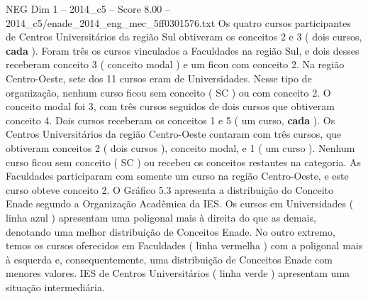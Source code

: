 \begin{textsample}{NEG Dim 1 – 2014\_c5 – Score 8.00 – 2014\_c5/enade\_2014\_eng\_mec\_5ff0301576.txt}
Os quatro cursos participantes de Centros Universitários da região Sul obtiveram os conceitos 2 e 3 ( dois cursos, \textbf{cada} ).
Foram três os cursos vinculados a Faculdades na região Sul, e dois desses receberam conceito 3 ( conceito modal ) e um ficou com conceito 2.
Na região Centro-Oeste, sete dos 11 cursos eram de Universidades.
Nesse tipo de organização, nenhum curso ficou sem conceito ( SC ) ou com conceito 2.
O conceito modal foi 3, com três cursos seguidos de dois cursos que obtiveram conceito 4.
Dois cursos receberam os conceitos 1 e 5 ( um curso, \textbf{cada} ).
Os Centros Universitários da região Centro-Oeste contaram com três cursos, que obtiveram conceitos 2 ( dois cursos ), conceito modal, e 1 ( um curso ).
Nenhum curso ficou sem conceito ( SC ) ou recebeu os conceitos restantes na categoria.
As Faculdades participaram com somente um curso na região Centro-Oeste, e este curso obteve conceito 2.
O Gráfico 5.3 apresenta a distribuição do Conceito Enade segundo a Organização Acadêmica da IES.
Os cursos em Universidades ( linha azul ) apresentam uma poligonal mais à direita do que as demais, denotando uma melhor distribuição de Conceitos Enade.
No outro extremo, temos os cursos oferecidos em Faculdades ( linha vermelha ) com a poligonal mais à esquerda e, consequentemente, uma distribuição de Conceitos Enade com menores valores.
IES de Centros Universitários ( linha verde ) apresentam uma situação intermediária.

\end{textsample}
